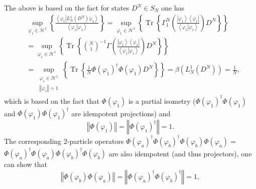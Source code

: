 \documentclass[aps,preprint]{revtex4}%
\begin{document}
The above is based on the fact for states $D^{N}\in S_{N}$ one has
\begin{align}
&  \sup_{\varphi_{1}\in\mathcal{H}^{1}}\left\{  \frac{\left\langle \left.
\varphi_{1}\right\vert L_{N}^{1}\left(  D^{N}\right)  \varphi_{1}\right\rangle
}{\left\langle \left.  \varphi_{1}\right\vert \varphi_{1}\right\rangle
}\right\}  =\sup_{\varphi_{1}\in\mathcal{H}^{1}}\left\{  \operatorname{Tr}%
\left\{  \Gamma_{1}^{N}\left(  \frac{\left\vert \varphi_{1}\right\rangle
\left\langle \varphi_{1}\right\vert }{\left\langle \left.  \varphi
_{1}\right\vert \varphi_{1}\right\rangle }\right)  D^{N}\right\}  \right\} \\
&  \left.  =\right.  \sup_{\varphi_{1}\in\mathcal{H}^{1}}\left\{
\operatorname{Tr}\left\{  \binom{N}{1}^{-1}\Gamma\left(  \frac{\left\vert
\varphi_{1}\right\rangle \left\langle \varphi_{1}\right\vert }{\left\langle
\left.  \varphi_{1}\right\vert \varphi_{1}\right\rangle }\right)
D^{N}\right\}  \right\} \\
&  \left.  =\right.  \sup_{\substack{\varphi_{1}\in\mathcal{H}^{1}\\\left\Vert
\varphi_{1}\right\Vert =1}}\left\{  \operatorname{Tr}\left\{  \frac{1}{N}%
\Phi\left(  \varphi_{1}\right)  ^{\dagger}\Phi\left(  \varphi_{1}\right)
D^{N}\right\}  \right\}  =\beta\left(  L_{N}^{1}\left(  D^{N}\right)  \right)
=\frac{1}{N},
\end{align}
which is based on the fact that $\Phi\left(  \varphi_{1}\right)  $ is a
partial isometry ($\Phi\left(  \varphi_{1}\right)  ^{\dagger}\Phi\left(
\varphi_{1}\right)  $ and $\Phi\left(  \varphi_{1}\right)  \Phi\left(
\varphi_{1}\right)  ^{\dagger}$ are idempotent projections) and
\begin{equation}
\left\Vert \Phi\left(  \varphi_{1}\right)  \right\Vert =\left\Vert \Phi\left(
\varphi_{1}\right)  ^{\dagger}\right\Vert =1.
\end{equation}
The corresponding 2-particle operators $\Phi\left(  \varphi_{a}\right)
^{\dagger}\Phi\left(  \varphi_{b}\right)  ^{\dagger}\Phi\left(  \varphi
_{b}\right)  \Phi\left(  \varphi_{a}\right)  =$ $\Phi\left(  \varphi
_{a}\right)  ^{\dagger}\Phi\left(  \varphi_{a}\right)  \Phi\left(  \varphi
_{b}\right)  ^{\dagger}\Phi\left(  \varphi_{b}\right)  $ are also idempotent
(and thus projectors), one can show that
\begin{equation}
\left\Vert \Phi\left(  \varphi_{b}\right)  \Phi\left(  \varphi_{a}\right)
\right\Vert =\left\Vert \Phi\left(  \varphi_{a}\right)  ^{\dagger}\Phi\left(
\varphi_{b}\right)  ^{\dagger}\right\Vert =1,
\end{equation}
\end{document}
